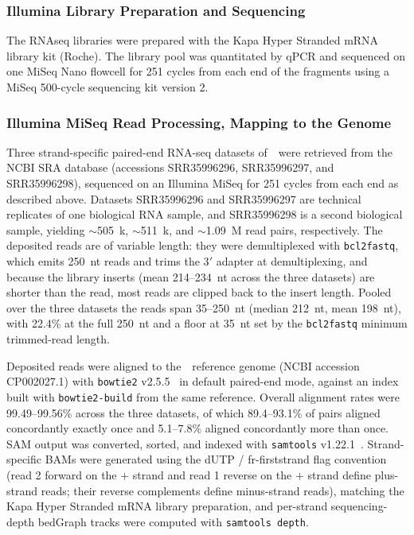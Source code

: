 \subsubsection{Illumina Library Preparation and Sequencing}

The RNAseq libraries were prepared with the Kapa Hyper Stranded mRNA library kit (Roche).
The library pool was quantitated by qPCR and sequenced on one MiSeq Nano flowcell for 251 cycles from each end of the fragments using a MiSeq 500-cycle sequencing kit version 2.

\subsubsection{Illumina MiSeq Read Processing, Mapping to the Genome}

Three strand-specific paired-end RNA-seq datasets of~\syn~were retrieved from the NCBI SRA database (accessions SRR35996296, SRR35996297, and SRR35996298), sequenced on an Illumina MiSeq for 251 cycles from each end as described above.
Datasets SRR35996296 and SRR35996297 are technical replicates of one biological RNA sample, and SRR35996298 is a second biological sample, yielding $\sim$505~k, $\sim$511~k, and $\sim$1.09~M read pairs, respectively.
The deposited reads are of variable length: they were demultiplexed with \texttt{bcl2fastq}, which emits 250~nt reads and trims the 3$'$ adapter at demultiplexing, and because the library inserts (mean 214--234~nt across the three datasets) are shorter than the read, most reads are clipped back to the insert length.
Pooled over the three datasets the reads span 35--250~nt (median 212~nt, mean 198~nt), with 22.4\% at the full 250~nt and a floor at 35~nt set by the \texttt{bcl2fastq} minimum trimmed-read length.

Deposited reads were aligned to the~\syn~reference genome (NCBI accession CP002027.1) with \texttt{bowtie2} v2.5.5~\cite{langmead_fast_2012} in default paired-end mode, against an index built with \texttt{bowtie2-build} from the same reference.
Overall alignment rates were 99.49--99.56\% across the three datasets, of which 89.4--93.1\% of pairs aligned concordantly exactly once and 5.1--7.8\% aligned concordantly more than once.
SAM output was converted, sorted, and indexed with \texttt{samtools} v1.22.1~\cite{li_sequence_2009}.
Strand-specific BAMs were generated using the dUTP / fr-firststrand flag convention (read 2 forward on the $+$ strand and read 1 reverse on the $+$ strand define plus-strand reads; their reverse complements define minus-strand reads), matching the Kapa Hyper Stranded mRNA library preparation, and per-strand sequencing-depth bedGraph tracks were computed with \texttt{samtools depth}.


